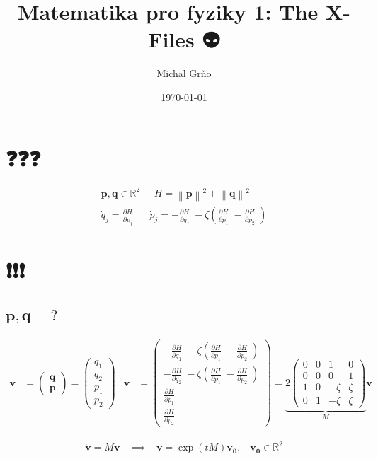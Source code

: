 \documentclass[10pt,a4paper]{article}
\newcommand{\norm}[1]{\left\lVert#1\right\rVert}
\newcommand{\mat}[1]{
    \begin{pmatrix}
        #1
    \end{pmatrix}
}
\newcommand{\pd}[2]{\frac{\partial  #1}{\partial  #2} \;}
\begin{document}
\title{Matematika pro fyziky 1: The X-Files 👽️}
\author{Michal Grňo}
\date{\today}

\maketitle

\section{❓️❓️❓️}

\begin{gather*}
    \bm{p}, \bm{q} \in \mathbb{R}^2
    \;\;\;\;\;
    H = \norm{\bm{p}}^2 + \norm{\bm{q}}^2
    \\[10pt]
    \dot{q}_j = \pd{H}{p_j}
    \;\;\;\;\;
    \dot{p}_j = -\pd{H}{q_j} - \zeta \left( \pd{H}{p_1} - \pd{H}{p_2} \right)
\end{gather*}

\section{❗️❗️❗️}

\subsection{
    \texorpdfstring{
        $\pmb{ p,q = \mathit{?} }$
    }{
        p,q = ?
    }
}

\begin{align*}
    \bm{v} &= \mat{ \bm{q} \\ \bm{p} } = \mat{ q_1 \\ q_2 \\ p_1 \\ p_2}
    &
    \dot{\bm{v}} &= \mat{
        -\pd{H}{q_1} - \zeta \left( \pd{H}{p_1} - \pd{H}{p_2} \right) \\
        -\pd{H}{q_2} - \zeta \left( \pd{H}{p_1} - \pd{H}{p_2} \right) \\
        \pd{H}{p_1} \\ \pd{H}{p_2}
    }
    =
    \underbrace{
        2
        \mat{
            0 & 0 & 1 & 0 \\
            0 & 0 & 0 & 1 \\
            1 & 0 & - \zeta & \zeta \\
            0 & 1 & - \zeta & \zeta
        }
    }_M \bm{v}
\end{align*}

\begin{align*}
    \boxed{
        \dot{\bm{v}} = M \bm{v} \;\;\;
        \implies \;\;\;
        \bm{v} = \exp(t M) \bm{v_0}, \;\;\;
        \bm{v_0} \in \mathbb{R}^2
    }
\end{align*}
\end{document}

